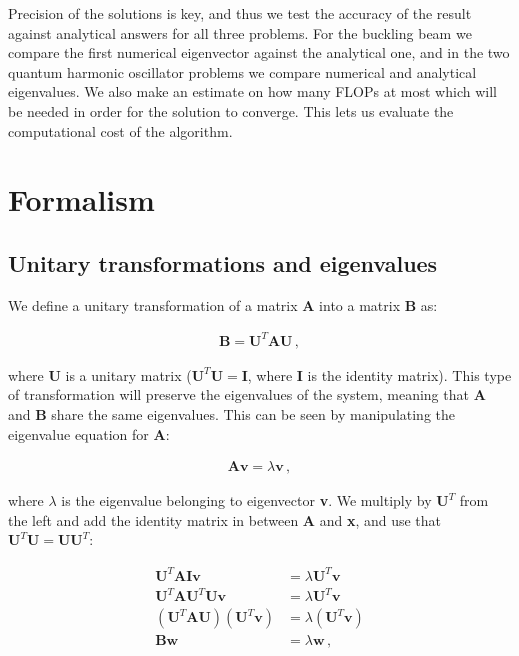 \documentclass[reprint,english,notitlepage]{revtex4-1}  %
\begin{document}
Precision of the solutions is key, and thus we test the accuracy of the result against analytical answers for all three problems. For the buckling beam we compare the first numerical eigenvector against the analytical one, and in the two quantum harmonic oscillator problems we compare numerical and analytical eigenvalues. We also make an estimate on how many FLOPs at most which will be needed in order for the solution to converge. This lets us evaluate the computational cost of the algorithm.

\section{Formalism} \label{sec:II}

\subsection{Unitary transformations and eigenvalues} \label{sec:II:a}

We define a unitary transformation of a matrix \textbf{A} into a matrix \textbf{B} as:

\begin{align*}
\textbf{B} = \textbf{U}^T \textbf{AU} \, ,
\end{align*}

where \textbf{U} is a unitary matrix ($\textbf{U}^T\textbf{U} = \textbf{I}$, where \textbf{I} is the identity matrix). This type of transformation will preserve the eigenvalues of the system, meaning that \textbf{A} and \textbf{B} share the same eigenvalues. This can be seen by manipulating the eigenvalue equation for \textbf{A}:

\begin{align*}
\textbf{A}\textbf{v} = \lambda \textbf{v} \, ,
\end{align*}

where $\lambda$ is the eigenvalue belonging to eigenvector \textbf{v}. We multiply by $\textbf{U}^T$ from the left and add the identity matrix in between \textbf{A} and \textbf{x}, and use that $\textbf{U}^T \textbf{U} = \textbf{UU}^T$:

\begin{align*}
\textbf{U}^T \textbf{AIv} &= \lambda \textbf{U}^T \textbf{v} \\
\textbf{U}^T \textbf{AU}^T \textbf{Uv} &= \lambda \textbf{U}^T \textbf{v} \\
(\textbf{U}^T \textbf{AU} ) (\textbf{U}^T \textbf{v}) &= \lambda (\textbf{U}^T \textbf{v}) \\
\textbf{Bw} &= \lambda \textbf{w} \, ,
\end{align*}
\end{document}

